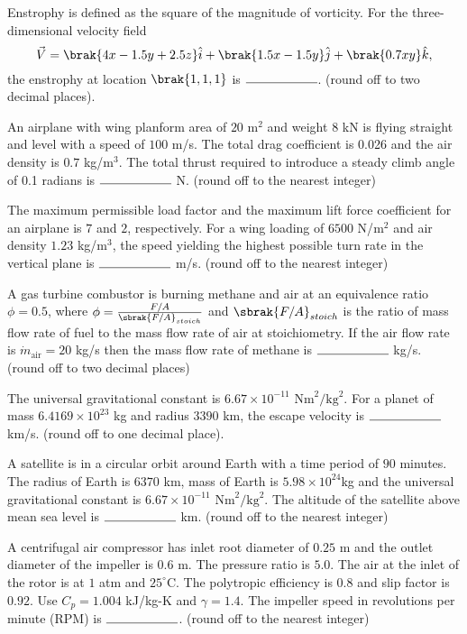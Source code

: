 	\item Enstrophy is defined as the square of the magnitude of vorticity. For the three-dimensional velocity field $$ \vec{V} = \brak{4x - 1.5y + 2.5z}\hat{i} + \brak{1.5x - 1.5y}\hat{j} + \brak{0.7xy} \hat{k},$$ the enstrophy at location $\brak{1, 1, 1}$ is $\rule{2cm}{0.4pt}$. (round off to two decimal places).

	\item An airplane with wing planform area of $20$ $\text{m}^2$ and weight $8$ kN is flying straight and level with a speed of $100$ m/s. The total drag coefficient is 0.026 and the air density is $0.7$ kg/$\text{m}^3$. The total thrust required to introduce a steady climb angle of 0.1 radians is $\rule{2cm}{0.4pt}$ N. (round off to the nearest integer)

	\item The maximum permissible load factor and the maximum lift force coefficient for an airplane is $7$ and $2$, respectively. For a wing loading of $6500$ N/$\text{m}^2$ and air density $1.23$ kg/$\text{m}^3$, the speed yielding the highest possible turn rate in the vertical plane is $\rule{2cm}{0.4pt}$ m/s. (round off to the nearest integer)

	\item A gas turbine combustor is burning methane and air at an equivalence ratio $\phi=0.5$, where $\phi=\frac{F/A}{\sbrak{F/A}_{stoich}}$ and $\sbrak{F/A}_{stoich}$ is the ratio of mass flow rate of fuel to the mass flow rate of air at stoichiometry. If the air flow rate is $\dot{m}_{\text{air}} = 20$ kg/s then the mass flow rate of methane is $\rule{2cm}{0.4pt}$ kg/s. (round off to two decimal places)

	\item The universal gravitational constant is $6.67\times10^{-11}$ $\text{Nm}^2/\text{kg}^2$. For a planet of mass $6.4169\times10^{23}$ kg and radius $3390$ km, the escape velocity is $\rule{2cm}{0.4pt}$ km/s. (round off to one decimal place).

	\item A satellite is in a circular orbit around Earth with a time period of $90$ minutes. The radius of Earth is $6370$ km, mass of Earth is $5.98\times10^{24}$kg and the universal gravitational constant is $6.67\times10^{-11}$ $\text{Nm}^2/\text{kg}^2$. The altitude of the satellite above mean sea level is $\rule{2cm}{0.4pt}$ km. (round off to the nearest integer)

	\item A centrifugal air compressor has inlet root diameter of $0.25$ m and the outlet diameter of the impeller is $0.6$ m. The pressure ratio is $5.0$. The air at the inlet of the rotor is at $1$ atm and $25^\circ$C. The polytropic efficiency is $0.8$ and slip factor is $0.92$. Use $C_p=1.004$ kJ/kg-K and $\gamma=1.4$. The impeller speed in revolutions per minute (RPM) is $\rule{2cm}{0.4pt}$. (round off to the nearest integer)

